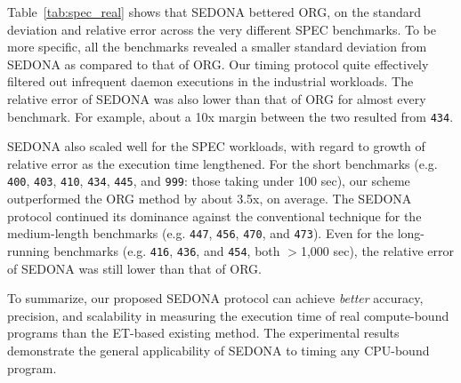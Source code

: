 \documentclass[letter]{ieice}
\begin{document}
{\color{blue}
Table~\ref{tab:spec_real} shows that 
SEDONA bettered ORG,
on the standard deviation and relative error across the very different SPEC benchmarks. 
To be more specific, all the benchmarks revealed a smaller standard deviation 
from SEDONA as compared to that of ORG. 
Our timing protocol quite effectively filtered out infrequent daemon executions 
in the industrial workloads. The relative error of SEDONA was also 
lower than that of ORG for almost every benchmark.
For example, about a 10x \hbox{margin} between the two resulted from {\tt 434}.
}

SEDONA also scaled well for the SPEC workloads, 
with regard to growth of relative error as the execution time lengthened.
For the short benchmarks 
(e.g. {\tt 400}, {\tt 403}, {\tt 410}, 
{\tt 434}, {\tt 445}, and {\tt 999}: those taking \hbox{under} 100 sec), 
our scheme outperformed the ORG method by about 3.5x, on average. 
The SEDONA protocol continued its dominance against the conventional technique 
for the medium-length benchmarks (e.g. {\tt 447}, {\tt 456}, {\tt 470}, and {\tt 473}).
{\color{blue}
Even for the long-running benchmarks (e.g. {\tt 416}, {\tt 436}, and {\tt 454}, both $>$1,000 sec), 
the relative error of \hbox{SEDONA} was still lower than that of ORG.
}

To summarize, our proposed SEDONA protocol can achieve {\em better} accuracy,
precision, and scalability in measuring the execution time of real \hbox{compute-bound} programs 
than the ET-based existing method. 
{\color{blue}
The experimental results demonstrate 
the general applicability of SEDONA to timing any CPU-bound program.}
\end{document}
